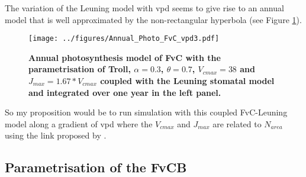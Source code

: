\documentclass[a4paper,11pt]{article}
\begin{document}
\clearpage

The variation of the Leuning model with vpd seems to give rise to an annual model that is well approximated by the non-rectangular hyperbola (see Figure \ref{fig:photo_annu_fvc_vpd3}).

\begin{figure}[ht]
\centering
\texttt{[image: ../figures/Annual\_Photo\_FvC\_vpd3.pdf]}
\caption{\textbf{Annual photosynthesis model of FvC with the parametrisation of Troll, $\alpha = 0.3$, $\theta = 0.7$, $V_{cmax} = 38$ and $J_{max} = 1.67 * V_{cmax}$ coupled with the Leuning stomatal model and integrated over one year in the left panel.}
\label{fig:photo_annu_fvc_vpd3}}
\end{figure}

So my proposition would be to run simulation with this coupled FvC-Leuning model along a gradient of vpd where the $V_{cmax}$ and $J_{max}$ are related to $N_{area}$ using the link proposed by \citep{Sakschewski-2015}.

\pagebreak


\subsection{Parametrisation of the FvCB}
\end{document}
